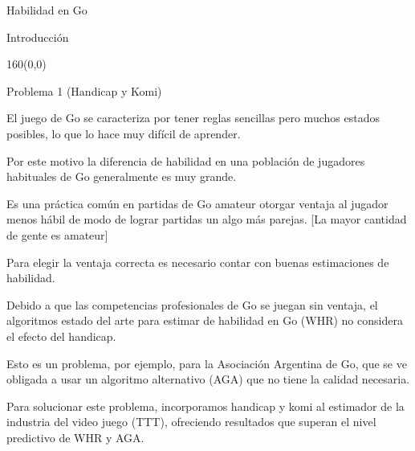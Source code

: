 \documentclass[shownotes,aspectratio=169]{beamer}
\begin{document}
\color{black!85}
\small


\begin{frame}[plain]
\begin{center}
 \Huge Habilidad en Go
\end{center}
\end{frame}

\begin{frame}[plain]
 \centering
 \LARGE Introducci\'on
 
\end{frame}

\begin{frame}[plain]
\begin{textblock}{160}(0,0)
\begin{center}
 \Large Problema 1 (Handicap y Komi)
\end{center}
\end{textblock}
 \vspace{0.75cm} \pause
 
  El juego de Go se caracteriza por tener reglas sencillas pero muchos estados posibles, lo que lo hace muy dif\'icil de aprender.
  
  \vspace{0.3cm} \pause
  
  Por este motivo la diferencia de habilidad en una poblaci\'on de jugadores habituales de Go generalmente es muy grande.
  
 \vspace{0.3cm} \pause
 
  Es una pr\'actica com\'un en partidas de Go amateur otorgar ventaja al jugador menos h\'abil de modo de lograr partidas un algo m\'as parejas. [La mayor cantidad de gente es amateur]
 
 \vspace{0.3cm} \pause
 
  Para elegir la ventaja correcta es necesario contar con buenas estimaciones de habilidad.
  
 \vspace{0.3cm} \pause
  
  Debido a que las competencias profesionales de Go se juegan sin ventaja, el algoritmos estado del arte para estimar de habilidad en Go (WHR) no considera el efecto del handicap.
 
 \vspace{0.3cm} \pause
 
  Esto es un problema, por ejemplo, para la Asociaci\'on Argentina de Go, que se ve obligada a usar un algoritmo alternativo (AGA) que no tiene la calidad necesaria.
  
 \vspace{0.3cm} \pause
 
  Para solucionar este problema, incorporamos handicap y komi al estimador de la industria del video juego (TTT), ofreciendo resultados que superan el nivel predictivo de WHR y AGA. 
 
\end{frame}
\end{document}
